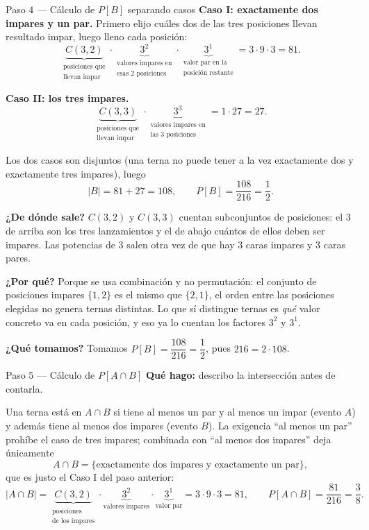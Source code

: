 \documentclass[11pt]{article}
\begin{document}
\begin{sol}
\begin{paso}{Paso 4 --- C\'alculo de $P[B]$ separando casos}
\textbf{Caso I: exactamente dos impares y un par.} Primero elijo cu\'ales dos de las tres posiciones llevan resultado impar, luego lleno cada posici\'on:
\[
\underbrace{C(3,2)}_{\substack{\text{posiciones que}\\ \text{llevan impar}}}\cdot
\underbrace{3^{2}}_{\substack{\text{valores impares en}\\ \text{esas 2 posiciones}}}\cdot
\underbrace{3^{1}}_{\substack{\text{valor par en la}\\ \text{posici\'on restante}}}
=3\cdot 9\cdot 3=81 .
\]

\textbf{Caso II: los tres impares.}
\[
\underbrace{C(3,3)}_{\substack{\text{posiciones que}\\ \text{llevan impar}}}\cdot
\underbrace{3^{3}}_{\substack{\text{valores impares en}\\ \text{las 3 posiciones}}}
=1\cdot 27=27 .
\]

Los dos casos son disjuntos (una terna no puede tener a la vez exactamente dos y exactamente tres impares), luego
\[
|B|=81+27=108,
\qquad
P[B]=\frac{108}{216}=\frac{1}{2}.
\]

\textbf{¿De d\'onde sale?} $C(3,2)$ y $C(3,3)$ cuentan subconjuntos de posiciones: el $3$ de arriba son los tres lanzamientos y el de abajo cu\'antos de ellos deben ser impares. Las potencias de $3$ salen otra vez de que hay $3$ caras impares y $3$ caras pares.

\textbf{¿Por qu\'e?} Porque se usa combinaci\'on y no permutaci\'on: el conjunto de posiciones impares $\{1,2\}$ es el mismo que $\{2,1\}$, el orden entre las posiciones elegidas no genera ternas distintas. Lo que s\'i distingue ternas es \emph{qu\'e} valor concreto va en cada posici\'on, y eso ya lo cuentan los factores $3^{2}$ y $3^{1}$.

\textbf{¿Qu\'e tomamos?} Tomamos $P[B]=\dfrac{108}{216}=\dfrac{1}{2}$, pues $216=2\cdot 108$.
\end{paso}

\begin{paso}{Paso 5 --- C\'alculo de $P[A\cap B]$}
\textbf{Qu\'e hago:} describo la intersecci\'on antes de contarla.

Una terna est\'a en $A\cap B$ si tiene al menos un par y al menos un impar (evento $A$) y adem\'as tiene al menos dos impares (evento $B$). La exigencia ``al menos un par'' proh\'ibe el caso de tres impares; combinada con ``al menos dos impares'' deja \'unicamente
\[
A\cap B=\{\text{exactamente dos impares y exactamente un par}\},
\]
que es justo el Caso I del paso anterior:
\[
|A\cap B|
=\underbrace{C(3,2)}_{\substack{\text{posiciones}\\ \text{de los impares}}}\cdot
\underbrace{3^{2}}_{\text{valores impares}}\cdot
\underbrace{3^{1}}_{\text{valor par}}
=3\cdot 9\cdot 3=81,
\qquad
P[A\cap B]=\frac{81}{216}=\frac{3}{8}.
\]


\end{paso}
\end{sol}
\end{document}
